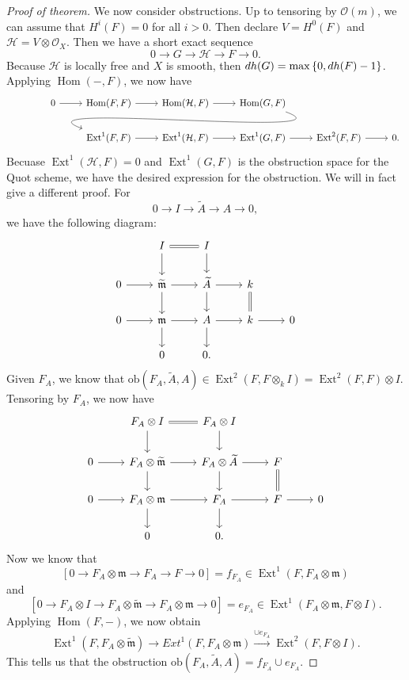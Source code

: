 \documentclass[leqno, openany]{memoir}
\theoremstyle{definition}
\theoremstyle{remark}
\theoremstyle{plain}
\theoremstyle{definition}
\theoremstyle{remark}
\newcommand{\mc}[1]{\mathcal{#1}}
\newcommand{\mf}[1]{\mathfrak{#1}}
\newcommand{\mr}[1]{\mathrm{#1}}
\newcommand{\wt}[1]{\widetilde{#1}}
\DeclareMathOperator{\Hom}{Hom}
\DeclareMathOperator{\Ext}{Ext}
\begin{document}
\begin{proof}[Proof of theorem]
We now consider obstructions. Up to tensoring by $\mc{O}(m)$, we can assume that $H^i(F) = 0$ for all $i > 0$. Then declare $V = H^0(F)$ and $\mc{H} = V \otimes \mc{O}_X$. Then we have a short exact sequence
\[ 0 \to G \to \mc{H} \to F \to 0. \]
Because $\mc{H}$ is locally free and $X$ is smooth, then $dh(G) = \max \qty{0, dh(F) - 1}$. Applying $\Hom(-, F)$, we now have
\begin{equation*}
\begin{tikzcd}
    0 \ar{r} & \Hom(F, F) \ar{r} & \Hom(\mc{H}, F) \ar{r} & \Hom(G, F) \ar[out=-20, in=160]{dll} \\
    & \Ext^1(F, F) \ar{r} & \Ext^1(\mc{H}, F) \ar{r} & \Ext^1(G, F) \ar{r} & \Ext^2(F, F) \ar{r} & 0.
\end{tikzcd}
\end{equation*}
Becuase $\Ext^1(\mc{H}, F) = 0$ and $\Ext^1(G, F)$ is the obstruction space for the Quot scheme, we have the desired expression for the obstruction. We will in fact give a different proof. For
\[ 0 \to I \to \wt{A} \to A \to 0, \]
we have the following diagram:
\begin{equation*}
\begin{tikzcd}
    & I \ar[equals]{r} \ar{d} & I \ar{d} \\
    0 \ar{r} & \wt{\mf{m}} \ar{r} \ar{d} & \wt{A} \ar{r} \ar{d} & k \ar[equals]{d} \\
    0 \ar{r} & \mf{m} \ar{r} \ar{d} & A \ar{d} \ar{r} & k \ar{r} & 0 \\
    & 0 & 0.
\end{tikzcd}
\end{equation*}
Given $F_A$, we know that $\mr{ob}(F_A, \wt{A}, A) \in \Ext^2(F, F \otimes_k I) = \Ext^2(F, F) \otimes I$. Tensoring by $F_A$, we now have
\begin{equation*}
\begin{tikzcd}
    & F_A \otimes I \ar[equals]{r} \ar{d} & F_A \otimes I \ar{d} \\
    0 \ar{r} & F_A \otimes \wt{\mf{m}} \ar{r} \ar{d} & F_A \otimes \wt{A} \ar{r} \ar{d} & F \ar[equals]{d} \\
    0 \ar{r} & F_A \otimes \mf{m} \ar{r} \ar{d} & F_A \ar{d} \ar{r} & F \ar{r} & 0 \\
    & 0 & 0.
\end{tikzcd}
\end{equation*}
Now we know that
\[ [0 \to F_A \otimes \mf{m} \to F_A \to F \to 0] = f_{F_A} \in \Ext^1(F, F_A \otimes \mf{m}) \]
and
\[[0 \to F_A \otimes I \to F_A \otimes \wt{\mf{m}} \to F_A \otimes \mf{m} \to 0] = e_{F_A} \in \Ext^1(F_A \otimes \mf{m}, F \otimes I). \]
Applying $\Hom(F, -)$, we now obtain
\[ \Ext^1(F, F_A \otimes \wt{\mf{m}}) \to Ext^1(F, F_A \otimes \mf{m}) \xrightarrow{\cup e_{F_A}} \Ext^2(F, F \otimes I). \]
This tells us that the obstruction $\mr{ob}(F_A, \wt{A}, A) = f_{F_A} \cup e_{F_A}$.


\end{proof}
\end{document}
